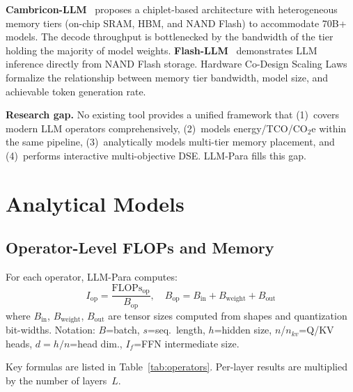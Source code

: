 \documentclass[journal]{IEEEtran}
\begin{document}
\textbf{Cambricon-LLM}~\cite{cambriconllm} proposes a chiplet-based
architecture with heterogeneous memory tiers (on-chip SRAM, HBM, and NAND
Flash) to accommodate 70B+ models. The decode throughput is bottlenecked by
the bandwidth of the tier holding the majority of model weights.
\textbf{Flash-LLM}~\cite{flashllm} demonstrates LLM inference directly
from NAND Flash storage. Hardware Co-Design Scaling Laws~\cite{scalinglaws}
formalize the relationship between memory tier bandwidth, model size, and
achievable token generation rate.

\noindent\textbf{Research gap.}
No existing tool provides a unified framework that (1)~covers modern LLM
operators comprehensively, (2)~models energy/TCO/CO$_2$e within the same
pipeline, (3)~analytically models multi-tier memory placement, and
(4)~performs interactive multi-objective DSE. LLM-Para fills this gap.

\section{Analytical Models}
\label{sec:models}

\subsection{Operator-Level FLOPs and Memory}

For each operator, LLM-Para computes:
\begin{equation}
  I_\text{op} = \frac{\text{FLOPs}_\text{op}}{B_\text{op}},\quad
  B_\text{op} = B_\text{in} + B_\text{weight} + B_\text{out}
  \label{eq:intensity}
\end{equation}
where $B_\text{in}$, $B_\text{weight}$, $B_\text{out}$ are tensor sizes
computed from shapes and quantization bit-widths.
Notation: $B$=batch, $s$=seq.\ length, $h$=hidden size, $n$/$n_{kv}$=Q/KV
heads, $d{=}h/n$=head dim., $I_f$=FFN intermediate size.

Key formulas are listed in Table~\ref{tab:operators}.
Per-layer results are multiplied by the number of layers~$L$.
\end{document}
